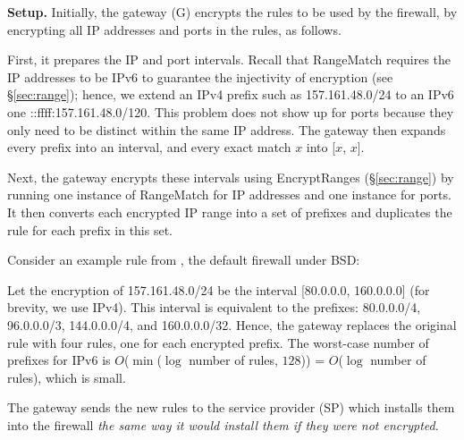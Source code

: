 \noindent\textbf{Setup.} Initially, the gateway (G) encrypts the rules to be used by the firewall, by encrypting all IP addresses and ports in the rules, as follows.

First, it prepares the IP and port intervals. Recall that RangeMatch requires the IP addresses to be IPv6 to guarantee the injectivity of encryption (see \S\ref{sec:range}); hence, we extend an IPv4 prefix  such as 157.161.48.0/24 to an IPv6 one  ::ffff:157.161.48.0/120. 
This problem does not show up for ports because they only need to be distinct within the same IP address.
The gateway then expands every prefix into an interval, and every exact match $x$ into [$x$, $x$]. 

Next, the gateway encrypts these intervals using EncryptRanges (\S\ref{sec:range}) by running one instance of RangeMatch for IP addresses and one instance for ports.
It then converts each encrypted IP range into a set of prefixes and duplicates the rule for each prefix in this set. 

Consider an example rule from  , the 
default firewall under BSD:
  \\ 
 
Let the encryption of 157.161.48.0/24 be the interval [80.0.0.0, 160.0.0.0] (for brevity, we use IPv4). 
This interval is equivalent to the prefixes: 80.0.0.0/4, 96.0.0.0/3, 144.0.0.0/4, and 160.0.0.0/32. 
Hence, the gateway replaces the original rule with four rules, one for each encrypted prefix. 
The worst-case number of prefixes for IPv6 is $O$($\min$($\log$ number of rules, $128$)) = $O$($\log$ number of rules), 
which is small. 







The gateway sends the new rules to the service provider (SP) which installs them into the firewall {\em the same way it would install 
them if they were not encrypted}. 

